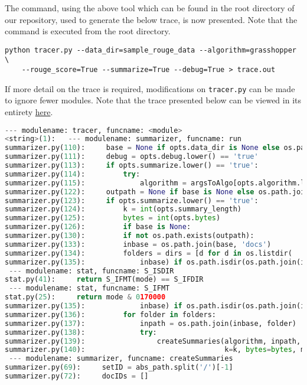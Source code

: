 \documentclass[11pt]{article}
\begin{document}
The command, using the above tool which can be found in the root directory of our repository, used to generate the below trace, is now presented. Note that the command is executed from the root directory. 
\begin{verbatim}
python tracer.py --data_dir=sample_rouge_data --algorithm=grasshopper \
	--rouge_score=True --summarize=True --debug=True > trace.out
\end{verbatim}

If more detail on the trace is required, modifications on \verb|tracer.py| can be made to ignore fewer modules. Note that the trace presented below can be viewed in its entirety \href{https://raw.githubusercontent.com/kandluis/document_summaries/master/trace.out}{here}.

\begin{lstlisting}[language=Python]
 --- modulename: tracer, funcname: <module>
<string>(1):   --- modulename: summarizer, funcname: run
summarizer.py(110):     base = None if opts.data_dir is None else os.path.abspath(opts.data_dir)
summarizer.py(111):     debug = opts.debug.lower() == 'true'
summarizer.py(113):     if opts.summarize.lower() == 'true':
summarizer.py(114):         try:
summarizer.py(115):             algorithm = argsToAlgo[opts.algorithm.lower()]
summarizer.py(122):     outpath = None if base is None else os.path.join(base, opts.algorithm)
summarizer.py(123):     if opts.summarize.lower() == 'true':
summarizer.py(124):         k = int(opts.summary_length)
summarizer.py(125):         bytes = int(opts.bytes)
summarizer.py(126):         if base is None:
summarizer.py(130):         if not os.path.exists(outpath):
summarizer.py(133):         inbase = os.path.join(base, 'docs')
summarizer.py(134):         folders = dirs = [d for d in os.listdir(
summarizer.py(135):             inbase) if os.path.isdir(os.path.join(inbase, d))]
 --- modulename: stat, funcname: S_ISDIR
stat.py(41):     return S_IFMT(mode) == S_IFDIR
 --- modulename: stat, funcname: S_IFMT
stat.py(25):     return mode & 0170000
summarizer.py(135):             inbase) if os.path.isdir(os.path.join(inbase, d))]
summarizer.py(136):         for folder in folders:
summarizer.py(137):             inpath = os.path.join(inbase, folder)
summarizer.py(138):             try:
summarizer.py(139):                 createSummaries(algorithm, inpath, outpath,
summarizer.py(140):                                 k=k, bytes=bytes, multiDocument=True)
 --- modulename: summarizer, funcname: createSummaries
summarizer.py(69):     setID = abs_path.split('/')[-1]
summarizer.py(72):     docIDs = []

\end{lstlisting}
\end{document}
